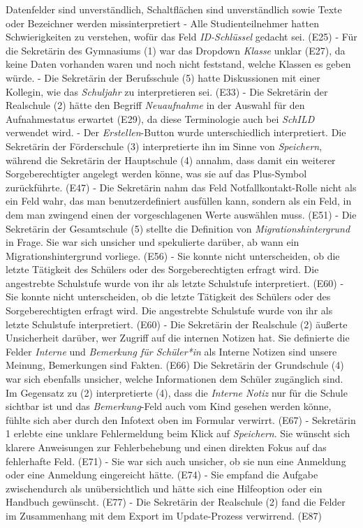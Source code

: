 Datenfelder sind unverständlich, Schaltflächen sind unverständlich sowie Texte oder Bezeichner werden missinterpretiert
- Alle Studienteilnehmer hatten Schwierigkeiten zu verstehen, wofür das Feld \textit{ID-Schlüssel} gedacht sei. (E25)
- Für die Sekretärin des Gymnasiums (1) war das Dropdown \textit{Klasse} unklar (E27), da keine Daten vorhanden waren und noch nicht feststand, welche Klassen es geben würde.
- Die Sekretärin der Berufsschule (5) hatte Diskussionen mit einer Kollegin, wie das \textit{Schuljahr} zu interpretieren sei. (E33)
- Die Sekretärin der Realschule (2) hätte den Begriff \textit{Neuaufnahme} in der Auswahl für den Aufnahmestatus erwartet (E29), da diese Terminologie auch bei \textit{SchILD} verwendet wird.
- Der \textit{Erstellen}-Button wurde unterschiedlich interpretiert. Die Sekretärin der Förderschule (3) interpretierte ihn im Sinne von \textit{Speichern}, während die Sekretärin der Hauptschule (4) annahm, dass damit ein weiterer Sorgeberechtigter angelegt werden könne, was sie auf das Plus-Symbol zurückführte. (E47)
- Die Sekretärin nahm das Feld Notfallkontakt-Rolle nicht als ein Feld wahr, das man benutzerdefiniert ausfüllen kann, sondern als ein Feld, in dem man zwingend einen der vorgeschlagenen Werte auswählen muss. (E51)
- Die Sekretärin der Gesamtschule (5) stellte die Definition von \textit{Migrationshintergrund} in Frage. Sie war sich unsicher und spekulierte darüber, ab wann ein Migrationshintergrund vorliege. (E56)
- Sie konnte nicht unterscheiden, ob die letzte Tätigkeit des Schülers oder des Sorgeberechtigten erfragt wird. Die angestrebte Schulstufe wurde von ihr als letzte Schulstufe interpretiert. (E60)
- Sie konnte nicht unterscheiden, ob die letzte Tätigkeit des Schülers oder des Sorgeberechtigten erfragt wird. Die angestrebte Schulstufe wurde von ihr als letzte Schulstufe interpretiert. (E60)
- Die Sekretärin der Realschule (2) äußerte Unsicherheit darüber, wer Zugriff auf die internen Notizen hat. Sie definierte die Felder \textit{Interne} und \textit{Bemerkung für Schüler*in} als \glqq Interne Notizen sind unsere Meinung, Bemerkungen sind Fakten\grqq{}. (E66) Die Sekretärin der Grundschule (4) war sich ebenfalls unsicher, welche Informationen dem Schüler zugänglich sind. Im Gegensatz zu (2) interpretierte (4), dass die \textit{Interne Notiz} nur für die Schule sichtbar ist und das \textit{Bemerkung}-Feld auch vom Kind gesehen werden könne, fühlte sich aber durch den Infotext oben im Formular verwirrt. (E67)
- Sekretärin 1 erlebte eine unklare Fehlermeldung beim Klick auf \textit{Speichern}. Sie wünscht sich klarere Anweisungen zur Fehlerbehebung und einen direkten Fokus auf das fehlerhafte Feld. (E71)
- Sie war sich auch unsicher, ob sie nun eine \glqq Anmeldung\grqq{} oder eine \glqq Anmeldung\grqq{} eingereicht hätte. (E74)
- Sie empfand die Aufgabe zwischendurch als unübersichtlich und hätte sich eine Hilfeoption oder ein Handbuch gewünscht. (E77)
- Die Sekretärin der Realschule (2) fand die Felder im Zusammenhang mit dem Export im Update-Prozess verwirrend. (E87)


